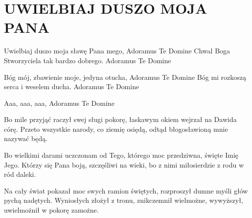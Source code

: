 \documentclass[../../../songbook.tex]{subfiles}
\begin{document}
\TabPositions{8cm} %
\section*{UWIELBIAJ DUSZO MOJA PANA}
{}
\vspace{0.5cm}
Uwielbiaj duszo moja sławę Pana mego,				     \newline	  
Adoramus Te Domine										 \newline
Chwal Boga Stworzyciela tak bardzo dobrego.				 \newline	
Adoramus Te Domine				 \newline	

Bóg mój, zbawienie moje, jedyna otucha, 				 \newline	
Adoramus Te Domine				 \newline	
Bóg mi rozkoszą serca i weselem ducha.				 \newline	
Adoramus Te Domine				 \newline	

\-\hspace{1cm} Aaa, aaa, aaa,				 \newline	
\-\hspace{1cm} Adoramus Te Domine 				 \newline	

Bo mile przyjąć raczył swej sługi pokorę, 				 \newline	
łaskawym okiem wejrzał na Dawida córę.				 \newline	
Przeto wszystkie narody, co ziemię osiędą, 				 \newline	
odtąd błogosławioną mnie nazywać będą.				 \newline	

Bo wielkimi darami uczczonam od Tego, 				 \newline	
którego moc przedziwna, święte Imię Jego.				 \newline	
Którzy się Pana boją, szczęśliwi na wieki, 				 \newline	
bo z nimi miłosierdzie z rodu w ród daleki.				 \newline	

Na cały świat pokazał moc swych ramion świętych, 				 \newline	
rozproszył dumne myśli głów pychą nadętych.				 \newline	
Wyniosłych złożył z tronu, znikczemnił wielmożne, 				 \newline	
wywyższył, uwielmożnił w pokorę zamożne.				 \newline	
\end{document}
